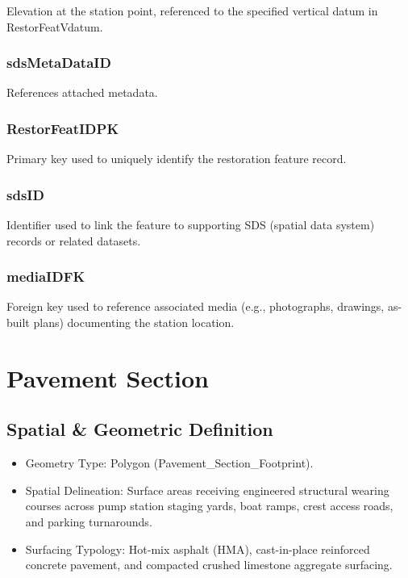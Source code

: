 \documentclass[
  letterpaper,
  DIV=11,
  numbers=noendperiod]{scrreprt}
\begin{document}
Elevation at the station point, referenced to the specified vertical
datum in RestorFeatVdatum.

\subsection{sdsMetaDataID}\label{sdsmetadataid-21}

References attached metadata.

\subsection{RestorFeatIDPK}\label{restorfeatidpk-21}

Primary key used to uniquely identify the restoration feature record.

\subsection{sdsID}\label{sdsid-21}

Identifier used to link the feature to supporting SDS (spatial data
system) records or related datasets.

\subsection{mediaIDFK}\label{mediaidfk-21}

Foreign key used to reference associated media (e.g., photographs,
drawings, as-built plans) documenting the station location.

\chapter{Pavement Section}\label{pavement-section}

\section{Spatial \& Geometric
Definition}\label{spatial-geometric-definition-22}

\begin{itemize}
\item
  Geometry Type: Polygon (Pavement\_Section\_Footprint).
\item
  Spatial Delineation: Surface areas receiving engineered structural
  wearing courses across pump station staging yards, boat ramps, crest
  access roads, and parking turnarounds.
\item
  Surfacing Typology: Hot-mix asphalt (HMA), cast-in-place reinforced
  concrete pavement, and compacted crushed limestone aggregate
  surfacing.
\end{itemize}
\end{document}
